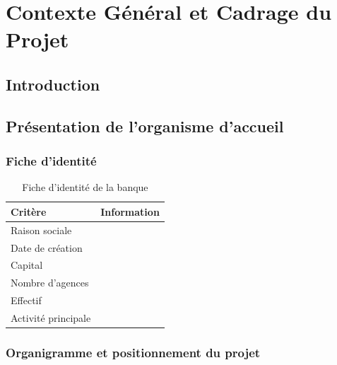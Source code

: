 \chapter{Contexte G\'en\'eral et Cadrage du Projet}
\minitoc


\section{Introduction}


\section{Présentation de l'organisme d'accueil}

\subsection{Fiche d'identité}


\begin{table}[H]
  \centering
  \caption{Fiche d'identité de la banque}
  \label{tab:fiche_banque}
  \begin{tabularx}{0.85\textwidth}{lX}
    \toprule
    \textbf{Critère} & \textbf{Information} \\
    \midrule
    Raison sociale     & \todo{} \\
    Date de création   & \todo{} \\
    Capital            & \todo{} \\
    Nombre d'agences   & \todo{} \\
    Effectif           & \todo{} \\
    Activité principale & \todo{} \\
    \bottomrule
  \end{tabularx}
\end{table}

\subsection{Organigramme et positionnement du projet}

